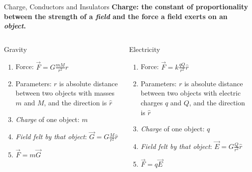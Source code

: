 \documentclass{beamer}
\begin{document}
\begin{frame}{Charge, Conductors and Insulators}
\centering
\textbf{\alert{Charge: the constant of proportionality between the strength of a \textit{field} and the force a field exerts on an \textit{object}.}} \\
\hrulefill
\small
\begin{columns}[T]
\begin{column}{0.5\textwidth}
\alert{Gravity}
\begin{enumerate}
\item Force: $\vec{F} = G \frac{m M}{r^2} \hat{r}$
\item Parameters: $r$ is absolute distance between two objects with masses $m$ and $M$, and the direction is $\hat{r}$
\item \textit{Charge} of one object: $m$
\item \textit{Field felt by that object}: $\vec{G} = G \frac{M}{r^2} \hat{r}$
\item $\vec{F} = m \vec{G}$
\end{enumerate}
\end{column}
\begin{column}{0.5\textwidth}
\alert{Electricity}
\begin{enumerate}
\item Force: $\vec{F} = k \frac{q Q}{r^2} \hat{r}$
\item Parameters: $r$ is absolute distance between two objects with electric charges $q$ and $Q$, and the direction is $\hat{r}$
\item \textit{Charge} of one object: $q$
\item \textit{Field felt by that object}: $\vec{E} = G \frac{Q}{r^2} \hat{r}$
\item $\vec{F} = q \vec{E}$
\end{enumerate}
\end{column}
\end{columns}
\end{frame}
\end{document}
